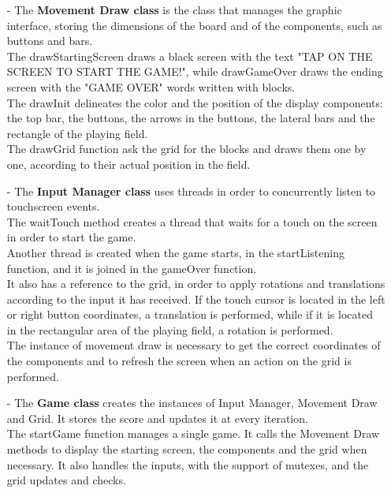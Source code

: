 \documentclass[18pt,oneside,a4paper, titlepage]{article}
\begin{document}
\begin{itemize}
		\item[-] The \textbf{Movement Draw class} is the class that manages the graphic interface, storing the dimensions of the board and of the components, such as buttons and bars.\\
		The drawStartingScreen draws a black screen with the text "TAP ON THE SCREEN TO START THE GAME!", while drawGameOver draws the ending screen with the "GAME OVER" words written with blocks.\\
		The drawInit delineates the color and the position of the display components: the top bar, the buttons, the arrows in the buttons, the lateral bars and the rectangle of the playing field.\\
		The drawGrid function ask the grid for the blocks and draws them one by one, according to their actual position in the field.\\
		
		
		\item[-] The \textbf{Input Manager class} uses threads in order to concurrently listen to touchscreen events.\\
		The waitTouch method creates a thread that waits for a touch on the screen in order to start the game.\\
		Another thread is created when the game starts, in the startListening function, and it is joined in the gameOver function.\\
		It also has a reference to the grid, in order to apply rotations and translations according to the input it has received. If the touch cursor is located in the left or right button coordinates, a translation is performed, while if it is located in the rectangular area of the playing field, a rotation is performed.\\
		The instance of movement draw is necessary to get the correct coordinates of the components and to refresh the screen when an action on the grid is performed.\\
		
		\item[-] The \textbf{Game class} creates the instances of Input Manager, Movement Draw and Grid. It stores the score and updates it at every iteration.\\
		The startGame function manages a single game. It calls the Movement Draw methods to display the starting screen, the components and the grid when necessary. It also handles the inputs, with the support of mutexes, and the grid updates and checks.
	\end{itemize}
\end{document}
